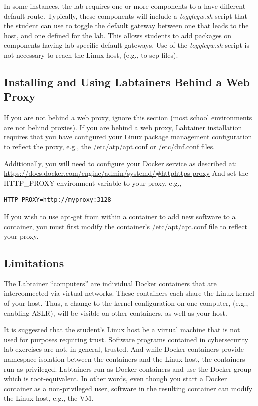 \documentclass[12pt]{article}
\begin{document}
In some instances, the lab requires one or more components to a have different default route.
Typically, these components will include a \textit{togglegw.sh} script that the student
can use to toggle the default gateway between one that leads to the host, and one defined for the lab.
This allows students to add packages on components having lab-specific default gateways.
Use of the \textit{togglegw.sh} script is not necessary to reach the Linux host, (e.g., to scp files).

\subsection{Installing and Using Labtainers Behind a Web Proxy}
If you are not behind a web proxy, ignore this section (most school environments
are not behind proxies). 
If you are behind a web proxy, Labtainer installation
requires that you have configured your Linux package management configuration to reflect
the proxy, e.g., the /etc/atp/apt.conf or /etc/dnf.conf files.  

Additionally, you will need to configure your Docker service as described at:
\url{https://docs.docker.com/engine/admin/systemd/#httphttps-proxy}
And set the HTTP\_PROXY environment variable to your proxy, e.g., 
\begin{verbatim}
HTTP_PROXY=http://myproxy:3128
\end{verbatim}
If you wish to use apt-get from within a container to add new software to a container, you
must first modify the container's /etc/apt/apt.conf file to reflect your proxy.

\subsection{Limitations}
The Labtainer ``computers'' are individual Docker containers that are interconnected via virtual
networks.  These containers each share the Linux kernel of your host.  Thus, a change
to the kernel configuration on one computer, (e.g., enabling ASLR), will be visible on
other containers, as well as your host.

It is suggested that the student's Linux host be a virtual machine that is
not used for purposes requiring trust.  Software programs contained in cybersecurity lab
exercises are not, in general, trusted.  And while Docker containers provide namespace
isolation between the containers and the Linux host, the containers run as privileged.
Labtainers run as Docker containers and use the Docker group 
which is root-equivalent.  In other words, even though you start a Docker container
as a non-privileged user, software in the resulting container can modify the Linux host,
e.g., the VM.
\end{document}
